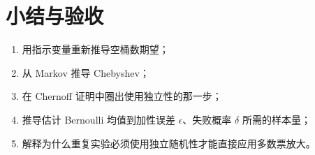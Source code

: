 \section{小结与验收}

\begin{checkpointbox}
\begin{enumerate}
  \item 用指示变量重新推导空桶数期望；
  \item 从 Markov 推导 Chebyshev；
  \item 在 Chernoff 证明中圈出使用独立性的那一步；
  \item 推导估计 Bernoulli 均值到加性误差 $\epsilon$、失败概率 $\delta$ 所需的样本量；
  \item 解释为什么重复实验必须使用独立随机性才能直接应用多数票放大。
\end{enumerate}
\end{checkpointbox}
